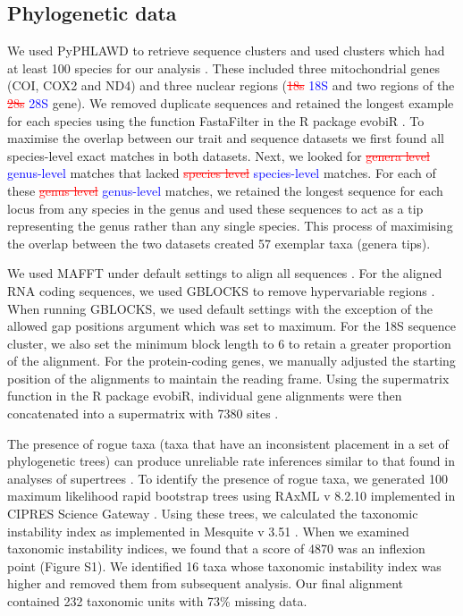 \documentclass[]{rsos}%
\begin{document}
\subsection{Phylogenetic data}
We used PyPHLAWD to retrieve sequence clusters and used clusters which had at least 100 species for our analysis \cite{smith2018phyphlawd}. 
These included three mitochondrial genes (COI, COX2 and ND4) and three nuclear
regions (\textcolor{red}{\st{18s}} \textcolor{blue}{18S} and two regions of the \textcolor{red}{\st{28s}} \textcolor{blue}{28S} gene). 
We removed duplicate sequences and retained the longest example for each species using the function FastaFilter in the R package evobiR \cite{blackmon2015evobir}.
To maximise the overlap between our trait and sequence datasets we first found all species-level exact matches in both datasets.
Next, we looked for \textcolor{red}{\st{genera level}} \textcolor{blue}{genus-level} matches that lacked \textcolor{red}{\st{species level}} \textcolor{blue}{species-level} matches.
For each of these \textcolor{red}{\st{genus level}} \textcolor{blue}{genus-level} matches, we retained the longest sequence for each locus from any species in the genus and used these sequences to act as a tip representing the genus rather than any single species. 
This process of maximising the overlap between the two datasets created 57 exemplar taxa (genera tips).

We used MAFFT under default settings to align all sequences \cite{katoh2013mafft}.
For the aligned RNA coding sequences, we used GBLOCKS to remove hypervariable regions \cite{castresana2000gblocks}. 
When running GBLOCKS, we used default settings with the exception of the allowed gap positions argument which was set to maximum. 
For the 18S sequence cluster, we also set the minimum block length to 6 to retain a greater proportion of the alignment. 
For the protein-coding genes, we manually adjusted the starting position of the alignments to maintain the reading frame. 
Using the supermatrix function in the R package evobiR, individual gene alignments were then concatenated into a supermatrix with 7380 sites \cite{blackmon2015evobir}.

The presence of rogue taxa (taxa that have an inconsistent placement in a set of phylogenetic trees) can produce unreliable rate inferences similar to that found in analyses of supertrees \cite{aberer2012roguetaxa, rabosky2015b}.
To identify the presence of rogue taxa, we generated 100 maximum likelihood rapid bootstrap trees using RAxML v 8.2.10 implemented in CIPRES Science Gateway \cite{stamatakis2014raxml,miller2010cipres}.
Using these trees, we calculated the taxonomic instability index as implemented in Mesquite v 3.51 \cite{maddison2018mesquite}.
When we examined taxonomic instability indices, we found that a score of 4870 was an inflexion point (Figure S1).
We identified 16 taxa whose taxonomic instability index was higher and removed them from subsequent analysis.
Our final alignment contained 232 taxonomic units with 73\% missing data.
\end{document}
